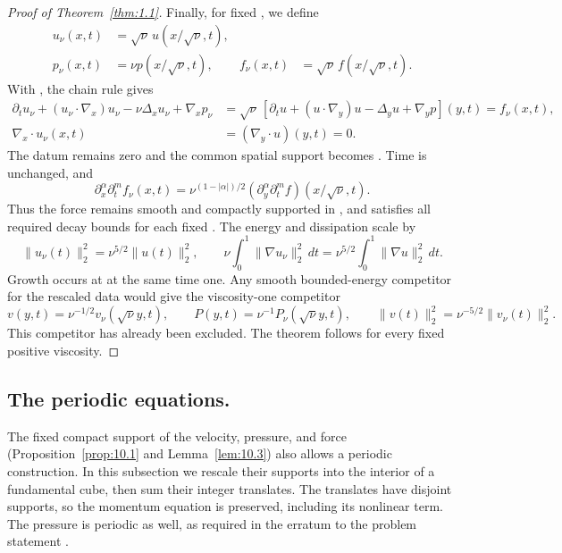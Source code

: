 \begin{proof}[Proof of Theorem~\ref{thm:1.1}]
Finally, for fixed , we define
\begin{equation}
\begin{aligned}
  u_\nu(x,t)&=\sqrt\nu\,u(x/\sqrt\nu,t),\\
  p_\nu(x,t)&=\nu p(x/\sqrt\nu,t),
  &f_\nu(x,t)&=\sqrt\nu\,f(x/\sqrt\nu,t).
\end{aligned}
\tag{10.22}\label{eq:10.22}
\end{equation}
With , the chain rule gives
\[
\begin{aligned}
  \partial_tu_\nu+(u_\nu\cdot\nabla_x)u_\nu-\nu\Delta_xu_\nu+\nabla_xp_\nu
  &=\sqrt\nu\,[\partial_tu+(u\cdot\nabla_y)u-\Delta_yu+\nabla_yp](y,t)
    =f_\nu(x,t),\\
  \nabla_x\cdot u_\nu(x,t)&=(\nabla_y\cdot u)(y,t)=0.
\end{aligned}
\]
The datum remains zero and the common spatial support becomes
. Time is unchanged, and
\[
  \partial_x^\alpha\partial_t^m f_\nu(x,t)
  =\nu^{(1-|\alpha|)/2}
   (\partial_y^\alpha\partial_t^m f)(x/\sqrt\nu,t).
\]
Thus the force remains smooth and compactly supported in
, and satisfies all required decay bounds for each
fixed . The energy and dissipation scale by
\begin{equation}
  \|u_\nu(t)\|_2^2=\nu^{5/2}\|u(t)\|_2^2,\qquad
  \nu\int_0^1\|\nabla u_\nu\|_2^2\,dt
  =\nu^{5/2}\int_0^1\|\nabla u\|_2^2\,dt.
\tag{10.23}\label{eq:10.23}
\end{equation}
Growth occurs at  at the same time one. Any smooth
bounded-energy competitor  for the rescaled data would
give the viscosity-one competitor
\[
  v(y,t)=\nu^{-1/2}v_\nu(\sqrt\nu y,t),\qquad
  P(y,t)=\nu^{-1}P_\nu(\sqrt\nu y,t),\qquad
  \|v(t)\|_2^2=\nu^{-5/2}\|v_\nu(t)\|_2^2.
\]
This competitor has already been excluded. The theorem follows for every fixed positive
viscosity.
\end{proof}

%
\subsection{The periodic equations.}\label{sec:10.5}
The fixed compact support of the velocity, pressure, and force
(Proposition~\ref{prop:10.1} and Lemma~\ref{lem:10.3}) also allows a periodic
construction. In this subsection we rescale their supports into the interior of a fundamental
cube, then sum their integer translates. The translates have disjoint supports, so the
momentum equation is preserved, including its nonlinear term. The pressure is periodic as
well, as required in the erratum to the problem statement \cite{ref-13}.

